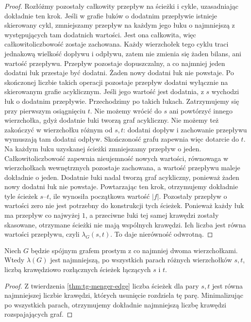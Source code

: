 \begin{proof}
Rozłóżmy pozostały całkowity przepływ na ścieżki
i cykle, uzasadniając dokładnie ten krok. Jeśli w grafie
łuków o dodatnim przepływie istnieje skierowany cykl,
zmniejszamy przepływ na każdym jego łuku o najmniejszą
z występujących tam dodatnich wartości. Jest ona
całkowita, więc całkowitoliczbowość zostaje zachowana.
Każdy wierzchołek tego cyklu traci jednakową wielkość
dopływu i odpływu, zatem nie zmienia się żaden bilans,
ani wartość przepływu. Przepływ pozostaje dopuszczalny,
a co najmniej jeden dodatni łuk przestaje być dodatni.
Żaden nowy dodatni łuk nie powstaje. Po skończonej liczbie
takich operacji pozostaje przepływ dodatni wyłącznie
na skierowanym grafie acyklicznym.
Jeśli jego wartość jest dodatnia, z $s$ wychodzi łuk
o dodatnim przepływie. Przechodzimy po takich łukach.
Zatrzymujemy się przy pierwszym osiągnięciu $t$.
Nie możemy wrócić do $s$ ani powtórzyć innego
wierzchołka, gdyż dodatnie łuki tworzą graf acykliczny.
Nie możemy też zakończyć w wierzchołku różnym od $s,t$:
dodatni dopływ i zachowanie przepływu wymuszają
tam dodatni odpływ. Skończoność grafu zapewnia więc
dotarcie do $t$. Na każdym łuku uzyskanej ścieżki
zmniejszamy przepływ o jeden. Całkowitoliczbowość
zapewnia nieujemność nowych wartości, równowaga
w wierzchołkach wewnętrznych pozostaje zachowana,
a wartość przepływu maleje dokładnie o jeden.
Dodatnie łuki nadal tworzą graf acykliczny, ponieważ
żaden nowy dodatni łuk nie powstaje. Powtarzając
ten krok, otrzymujemy dokładnie tyle ścieżek $s$--$t$,
ile wynosiła początkowa wartość $|f|$.
Pozostały przepływ o wartości zero nie jest potrzebny
do konstrukcji tych ścieżek.
Ponieważ każdy łuk ma przepływ co najwyżej $1$,
a przeciwne łuki tej samej krawędzi zostały skasowane,
otrzymane ścieżki nie mają wspólnych krawędzi.
Ich liczba jest równa wartości przepływu,
czyli $\lambda_G(s,t)$. To daje nierówność odwrotną.
\end{proof}

\begin{wniosek}
Niech $G$ będzie spójnym grafem prostym z co najmniej
dwoma wierzchołkami. Wtedy $\lambda(G)$ jest najmniejszą,
po wszystkich parach różnych wierzchołków $s,t$,
liczbą krawędziowo rozłącznych ścieżek łączących $s$ i $t$.
\end{wniosek}

\begin{proof}
Z twierdzenia \ref{thm:tg-menger-edge} liczba ścieżek
dla pary $s,t$ jest równa najmniejszej liczbie krawędzi,
których usunięcie rozdziela tę parę. Minimalizując po
wszystkich parach, otrzymujemy dokładnie najmniejszą
liczbę krawędzi rozspajających graf.
\end{proof}

